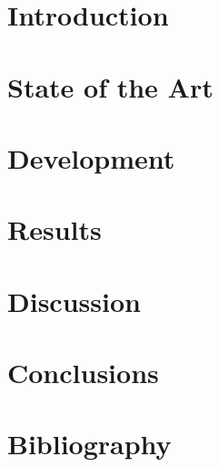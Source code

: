 \documentclass[11pt]{report} %
\begin{document}
\tableofcontents
\newpage

\onehalfspacing%

\chapter{Introduction} %

\chapter{State of the Art} %

\chapter{Development} %

\chapter{Results} %

\chapter{Discussion} %

\chapter{Conclusions} %

\chapter{Bibliography} %
\end{document}

